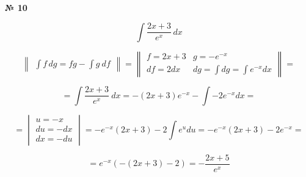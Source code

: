 \documentclass{article}
\begin{document}
\textbf{№ 10} 

\begingroup

\Large

$$ \int \frac{2x+3}{e^x} \,dx $$

$$ \begin{Vmatrix} \int f \,dg = fg - \int g \ df \end{Vmatrix} =
   \begin{Vmatrix} f = 2x+3 &  g = -e^{-x} \\
                  df = 2dx  & dg = \int dg = \int e^{-x} dx \end{Vmatrix} 
= $$

$$ = \int \frac{2x+3}{e^x} \ dx = -(2x+3)e^{-x} - \int -2 e^{-x}dx = $$

$$ = \begin{vmatrix} u = -x \\ 
                    du = -dx \\
                    dx = - du \end{vmatrix} 
= -e^{-x}(2x+3) -2 \int e^{u}du 
= -e^{-x}(2x+3) -2e^{-x}
= $$

$$ = e^{-x}(-(2x+3)-2)
= -\frac{2x+5}{e^{x}} $$

\endgroup
\end{document}
